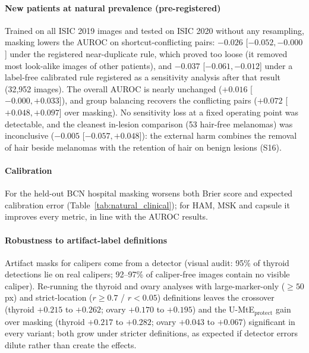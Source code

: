 \paragraph{New patients at natural prevalence (pre-registered)} Trained on all ISIC 2019 images and tested on ISIC 2020
without any resampling, masking lowers the AUROC on shortcut-conflicting pairs: $-0.026$ [$-0.052, -0.000$] under the
registered near-duplicate rule, which proved too loose (it removed most look-alike images of other patients), and
$-0.037$ [$-0.061, -0.012$] under a label-free calibrated rule registered as a sensitivity analysis after that result
(32,952 images). The overall AUROC is nearly unchanged ($+0.016$ [$-0.000, +0.033$]), and group balancing recovers the
conflicting pairs ($+0.072$ [$+0.048, +0.097$] over masking). No sensitivity loss at
a fixed operating point was detectable, and the cleanest in-lesion comparison (53 hair-free melanomas) was
inconclusive ($-0.005$ [$-0.057, +0.048$]): the external harm combines the removal of hair beside melanomas with the
retention of hair on benign lesions (S16).

\paragraph{Calibration} For the held-out BCN hospital masking worsens both Brier score and expected calibration error
(Table~\ref{tab:natural_clinical}); for HAM, MSK and capsule it improves every metric, in line with the AUROC results.


\paragraph{Robustness to artifact-label definitions}
Artifact masks for calipers come from a detector (visual audit: 95\% of thyroid detections lie on real calipers;
92--97\% of caliper-free images contain no visible caliper). Re-running the thyroid and ovary analyses with
large-marker-only ($\ge 50$ px) and strict-location ($r\ge0.7$ / $r<0.05$) definitions leaves the crossover
(thyroid $+0.215$ to $+0.262$; ovary $+0.170$ to $+0.195$) and the U-MtE$_{\text{protect}}$ gain over masking
(thyroid $+0.217$ to $+0.282$; ovary $+0.043$ to $+0.067$) significant in every variant; both grow under stricter
definitions, as expected if detector errors dilute rather than create the effects.

